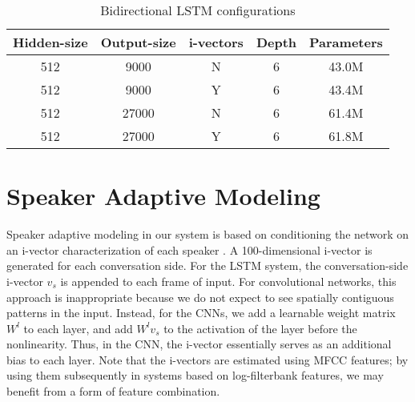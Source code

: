 \documentclass{article}
\begin{document}
\begin{table}[tbh]
    \centering
\caption{Bidirectional LSTM configurations}
\label{tab:lstm}
    \small
    \begin{tabular}{|c|c|c|c|c|}
    \hline
Hidden-size & Output-size & i-vectors & Depth & Parameters  \\ \hline
512 & 9000 & N & 6 & 43.0M \\ \hline
512 & 9000 & Y & 6 & 43.4M \\ \hline
512 & 27000 & N & 6 & 61.4M \\ \hline
512 & 27000 & Y & 6 & 61.8M \\ \hline
    \end{tabular}
\end{table}


\section{Speaker Adaptive Modeling}
\label{sec:sam}









Speaker adaptive modeling in our system is based on 
conditioning the network on an i-vector  \cite{dehak2011front}  
characterization of each 
speaker \cite{saon2013speaker,saonSRK16}.
A 100-dimensional i-vector is generated for each conversation side.
For the LSTM system,
the conversation-side i-vector $v_s$ is appended to each frame of input.
For convolutional networks, this approach is inappropriate because
we do not expect to see spatially contiguous patterns in the input.
Instead, for the CNNs, we add a learnable weight matrix $W^l$ to each 
layer, and add $W^l v_s$ to the activation of the layer before the 
nonlinearity. Thus, in the CNN, the i-vector essentially serves as an 
additional bias to each layer. Note that the i-vectors are estimated
using MFCC features; by using them subsequently in systems based on
log-filterbank features, we may benefit from a form of feature 
combination.
\end{document}
